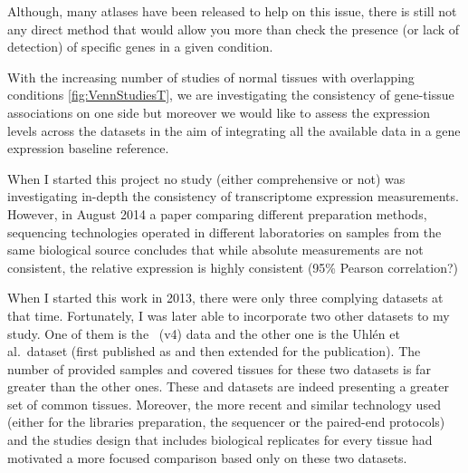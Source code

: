 Although, many atlases have been released to help on this issue,
there is still not any direct method that would allow you more than check the
presence (or lack of detection) of specific genes in a given condition.

With the increasing number of studies of normal tissues with overlapping conditions
\cref{fig:VennStudiesT}, we are investigating the consistency of gene-tissue
associations on one side but moreover we would like to assess the expression
levels across the datasets in the aim of integrating all the available data in a
gene expression baseline reference.

When I started this project no study (either comprehensive or not) was
investigating in-depth the consistency of transcriptome expression measurements.
However, in August 2014 a paper comparing different preparation methods,
sequencing technologies operated in different laboratories
on samples from the same biological source concludes that while absolute
measurements are not consistent, the relative expression is highly consistent
(95\% Pearson correlation?)

\begin{comment}
The main question when I started this project was to appraise how much consistent
(robust) is the \Rnaseq\ technology to quantify the gene expression. While it
is comparable to microarrays for differential gene expression analysis study
\TK{add reference},
\Rnaseq\ plus: detect new things - minus: sampling problems (stuff might be there
but won't be ``fished''.
\end{comment}

When I started this work in 2013, there were only three complying
datasets at that time. Fortunately, I was later
able to incorporate two other datasets to my study. One of them is the \Gtex\
(v4) data and the other one is the Uhlén et al.\ dataset (first
published as \citet{Uhlen2014} and then extended for the \citet{Uhlen2015} publication).
The number of provided samples and covered tissues for these two datasets
is far greater than the other ones. These \dataset{\Gtex} and 
datasets are indeed presenting a greater set of common tissues. Moreover,
the more recent and similar technology used (either for the libraries preparation,
the sequencer or the paired-end protocols) and the studies design that includes
biological replicates for every tissue had motivated a more focused comparison
based only on these two datasets.

